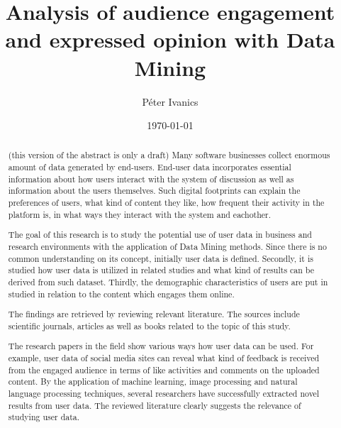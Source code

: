 \documentclass[english]{tktltiki}
\begin{document}
\onehalfspacing

\title{Analysis of audience engagement and expressed opinion with Data Mining}
\author{P\'eter Ivanics}

\date{\today}

\maketitle


\begin{abstract}
(this version of the abstract is only a draft)
Many software businesses collect enormous amount of data generated by end-users. End-user data incorporates essential information about how users interact with the system of discussion as well as information about the users themselves. Such digital footprints can explain the preferences of users, what kind of content they like, how frequent their activity in the platform is, in what ways they interact with the system and eachother.

The goal of this research is to study the potential use of user data in business and research environments with the application of Data Mining methods. Since there is no common understanding on its concept, initially user data is defined. Secondly, it is studied how user data is utilized in related studies and what kind of results can be derived from such dataset. Thirdly, the demographic characteristics of users are put in studied in relation to the content which engages them online.

The findings are retrieved by reviewing relevant literature. The sources include scientific journals, articles as well as books related to the topic of this study. 

The research papers in the field show various ways how user data can be used. For example, user data of social media sites can reveal what kind of feedback is received from the engaged audience in terms of like activities and comments on the uploaded content. By the application of machine learning, image processing and natural language processing techniques, several researchers have successfully extracted novel results from user data. The reviewed literature clearly suggests the relevance of studying user data.
 
\end{abstract}
\end{document}
